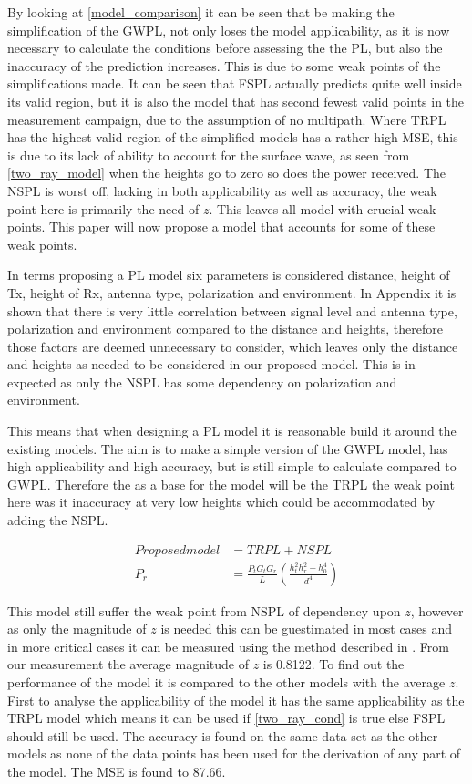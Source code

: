 
By looking at \autoref{model_comparison} it can be seen that be making the simplification of the GWPL, not only loses the model applicability, as it is now necessary to calculate the conditions before assessing the the PL, but also the inaccuracy of the prediction increases. This is due to some weak points of the simplifications made. It can be seen that FSPL actually predicts quite well inside its valid region, but it is also the model that has second fewest valid points in the measurement campaign, due to the assumption of no multipath. Where TRPL has the highest valid region of the simplified models has a rather high MSE, this is due to its lack of ability to account for the surface wave, as seen from \eqref{two_ray_model} when the heights go to zero so does the power received. The NSPL is worst off, lacking in both applicability as well as accuracy, the weak point here is primarily the need of $z$. This leaves all model with crucial weak points. This paper will now propose a model that accounts for some of these weak points. 


In terms proposing a PL model six parameters is considered distance, height of Tx, height of Rx, antenna type, polarization and environment. In Appendix it is shown that there is very little correlation between signal level and antenna type, polarization and environment compared to the distance and heights, therefore those factors are deemed unnecessary to consider, which leaves only the distance and heights as needed to be considered in our proposed model. This is in expected as only the NSPL has some dependency on polarization and environment. 

This means that when designing a PL model it is reasonable build it around the existing models. The aim is to make a simple version of the GWPL model, has high applicability and high accuracy, but is still simple to calculate compared to GWPL. Therefore the as a base for the model will be the TRPL the weak point here was it inaccuracy at very low heights which could be accommodated by adding the NSPL. 

\begin{align}
Proposed model &= TRPL + NSPL \\
P_r & = \frac{P_t G_t G_r }{L}\left(\frac{h_t^2 h_r^2+h_0^4}{d^4}\right)
\end{align}

This model still suffer the weak point from NSPL of dependency upon $z$, however as only the magnitude of $z$ is needed this can be guestimated in most cases and in more critical cases it can be measured using the method described in \cite{Kim}. From our measurement the average magnitude of $z$ is 0.8122. To find out the performance of the model it is compared to the other models with the average $z$. First to analyse the applicability of the model it has the same applicability as the TRPL model which means it can be used if \eqref{two_ray_cond} is true else FSPL should still be used. The accuracy is found on the same data set as the other models as none of the data points has been used for the derivation of any part of the model. The MSE is found to 87.66.

